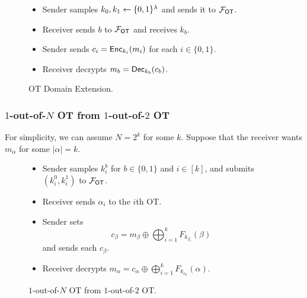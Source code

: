 \begin{figure}[h]
	\begin{mdframed}[
		linecolor=black,
		linewidth=1pt,
		roundcorner=5pt,
		backgroundcolor=white,
		userdefinedwidth=\textwidth,
		]
		\vspace{2mm}
		\begin{itemize}
			\item Sender samples $k_0, k_1\gets\{0,1\}^\lambda$ and sends it to $\mathcal{F}_\mathsf{OT}$.
			\item Receiver sends $b$ to $\mathcal{F}_\mathsf{OT}$ and receives $k_b$.
			\item Sender sends $c_i = \mathsf{Enc}_{k_i}(m_i)$ for each $i\in\{0,1\}.$
			\item Receiver decrypts $m_b = \mathsf{Dec}_{k_b}(c_b)$.
		\end{itemize}
		\vspace{2mm}
	\end{mdframed}
	\caption{OT Domain Extension.}
	\label{fig:OTDomainExtension}
\end{figure}

\subsubsection{$1$-out-of-$N$ OT from $1$-out-of-$2$ OT}

For simplicity, we can assume $N=2^k$ for some $k$. Suppose that the receiver wants $m_\alpha$ for some $|\alpha|=k$.

\begin{figure}[h]
	\begin{mdframed}[
		linecolor=black,
		linewidth=1pt,
		roundcorner=5pt,
		backgroundcolor=white,
		userdefinedwidth=\textwidth,
		]
		\vspace{2mm}
		\begin{itemize}
			\item Sender samples $k_i^{b}$ for $b\in\{0,1\}$ and $i\in[k]$, and submits $(k_i^0, k_i^{1})$ to $\mathcal{F}_\mathsf{OT}$.
			\item Receiver sends $\alpha_i$ to the $i$th OT.
			\item Sender sets
			$$c_\beta = m_\beta\oplus \bigoplus_{i=1}^k F_{k_{\beta_i}}(\beta)$$ and sends each $c_\beta$. 
			\item Receiver decrypts $m_\alpha = c_\alpha\oplus\bigoplus_{i=1}^k F_{k_{\alpha_i}}(\alpha)$.
		\end{itemize}
		\vspace{2mm}
	\end{mdframed}
	\caption{$1$-out-of-$N$ OT from $1$-out-of-$2$ OT.}
	\label{fig:1outofNOT}
\end{figure}
